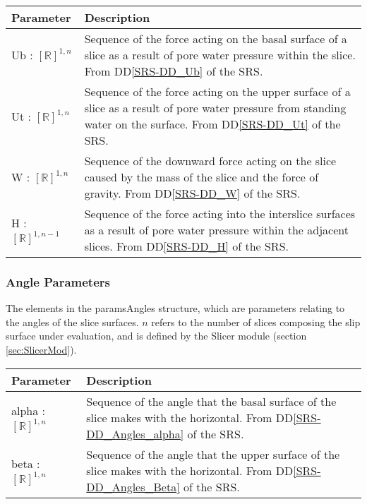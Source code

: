 \documentclass[12pt, titlepage]{article}
\begin{document}
\begin{center}
\begin{longtable}{ p{} 
    p{}}\hline 

  \textbf{Parameter} & \textbf{Description}\\ \hline

  Ub : $[\mathbb{R}]^{1,n}$ & Sequence of the force acting on the
  basal surface of a slice as a result of pore water pressure within
  the slice. From DD\ref{SRS-DD_Ub} of the SRS.\\
  
  Ut : $[\mathbb{R}]^{1,n}$ & Sequence of the force acting on the
  upper surface of a slice as a result of pore water pressure from standing
  water on the surface. From DD\ref{SRS-DD_Ut} of the SRS.\\

  W : $[\mathbb{R}]^{1,n}$ & Sequence of the downward force acting on
  the slice caused by the mass of the slice and the force of
  gravity. From DD\ref{SRS-DD_W} of the SRS.\\

  H : $[\mathbb{R}]^{1,n-1}$ & Sequence of the force acting into the
  interslice surfaces as a result of pore water pressure within the
  adjacent slices. From DD\ref{SRS-DD_H} of the SRS.\\ \hline
\end{longtable}
\end{center}

\subsubsection{Angle Parameters} \label{Tbl:AngleParam}
\noindent
The elements in the paramsAngles structure, which are parameters relating to 
the angles of the slice surfaces. $n$ refers to the number of slices composing 
the slip surface under evaluation, and is defined by the Slicer module (section 
\ref{sec:SlicerMod}).

\begin{center}
\begin{longtable}{ p{}
    p{}}\hline 
  \textbf{Parameter} & \textbf{Description}\\ \hline

  alpha : $[\mathbb{R}]^{1,n}$ & Sequence of the angle that the basal
  surface of the slice makes with the horizontal. From 
  DD\ref{SRS-DD_Angles_alpha} of the SRS.\\

  beta : $[\mathbb{R}]^{1,n}$ & Sequence of the angle that the upper
  surface of the slice makes with the horizontal. From 
  DD\ref{SRS-DD_Angles_Beta} of the SRS.\\ \hline
\end{longtable}
\end{center}
\end{document}
